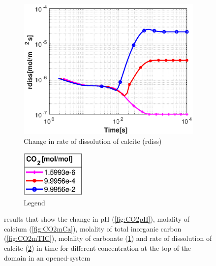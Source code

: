 \begin{figure}[!h]
\begin{subfigure}{.5\linewidth}
        \label{fig:CO2mCO3}
    \end{subfigure}%
    \hfill
    \begin{subfigure}{.5\linewidth}
            \centering
        \includegraphics[width=\textwidth]{PICTURES/with_CO2_rdiss.eps}
        \caption{Change in rate of dissolution of calcite (rdiss)}
        \label{fig:CO2rdiss}
    \end{subfigure}%
    \hfill
    \begin{subfigure}{.5\linewidth}
            \centering
        \includegraphics[width=0.35\textwidth]{PICTURES/with_CO2_legend.eps}
        \caption{Legend}
        \label{fig:CO2legend}
    \end{subfigure}%
    \caption{\DuMuX results that show the change in pH (\cref{fig:CO2pH}), molality of calcium (\cref{fig:CO2mCa}), 
    molality of total inorganic carbon (\cref{fig:CO2mTIC}), molality of carbonate (\cref{fig:CO2mCO3}) and rate of 
    dissolution of calcite (\cref{fig:CO2rdiss}) in time for different  concentration at the top of the domain in an opened-system}
    \label{fig:diffCO2}
\end{figure}

